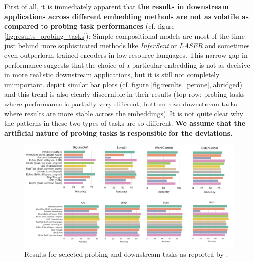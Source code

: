 First of all, it is immediately apparent that \textbf{the results in downstream applications across different embedding methods are not as volatile as compared to probing task performances} (cf. figure \vref{fig:results_probing_tasks}): Simple compositional models are most of the time just behind more sophisticated methods like \textit{InferSent} or \textit{LASER} and sometimes even outperform trained encoders in low-resource languages. This narrow gap in performance suggests that the choice of a particular embedding is not as decisive in more realistic downstream applications, but it is still not completely unimportant. \citep{Perone.2018} depict similar bar plots (cf. figure \vref{fig:results_perone}, abridged) and this trend is also clearly discernible in their results (top row: probing tasks where performance is partially very different, bottom row: downstream tasks where results are more stable across the embeddings). It is not quite clear why the patterns in these two types of tasks are so different. \textbf{We assume that the artificial nature of probing tasks is responsible for the deviations.}

\begin{figure}[h]
	\centering
	\includegraphics[scale=0.425]{images/results_perone}
	\caption[Results reported by Perone and colleagues]
		{Results for selected probing and downstream tasks as reported by \citep{Perone.2018}.}
	\label{fig:results_perone}
\end{figure}

